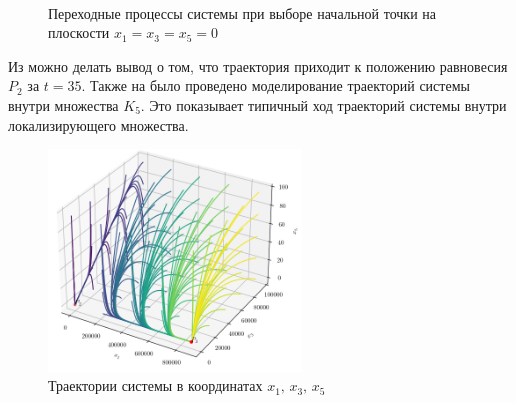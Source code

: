 \documentclass[14pt,a4paper]{extarticle}
\begin{document}
\begin{example}
		\begin{figure}[h]
			\centering
			\\
			\caption{Переходные процессы системы при выборе начальной точки на плоскости $x_1=x_3=x_5=0$}
			\label{fig:on_D_border}
		\end{figure}
		Из  можно делать вывод о том, что траектория приходит к положению равновесия $P_2$ за $t=35$.
		\newpage
		Также на  было проведено моделирование траекторий системы внутри множества $K_5$. Это показывает типичный ход траекторий системы внутри локализирующего множества.
		
		\begin{figure}[h]
			\centering
			\includegraphics[width=0.60\textwidth]{media/Figure_11.png}
			\caption{Траектории системы в координатах $x_1,\,x_3,\,x_5$}
			\label{fig:model_K5}
		\end{figure}
	\end{example}
	
\end{document}
